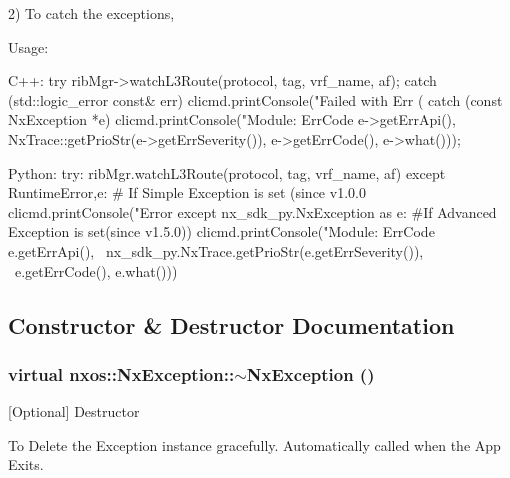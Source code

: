 2) To catch the exceptions, 
\begin{DoxyCode}
  Usage:

  C++:
     try {
         ribMgr->watchL3Route(protocol, tag, vrf_name, af);
     } catch (std::logic_error const& err) {
         clicmd.printConsole("Failed with Err (%
     } catch (const NxException *e) {
         clicmd.printConsole("Module: %
                             ErrCode %
                             e->getErrApi(), 
                             NxTrace::getPrioStr(e->getErrSeverity()), 
                             e->getErrCode(), e->what()));
     }

  Python:
     try:           
        ribMgr.watchL3Route(protocol, tag, vrf_name, af)       
     except RuntimeError,e:                     
        # If Simple Exception is set (since v1.0.0
        clicmd.printConsole("Error %
     except nx_sdk_py.NxException as e:           
        #If Advanced Exception is set(since v1.5.0))
        clicmd.printConsole("Module: %
                            ErrCode %
                            e.getErrApi(), \
                            nx_sdk_py.NxTrace.getPrioStr(e.getErrSeverity()), \
                            e.getErrCode(), e.what()))  
\end{DoxyCode}
 

\subsection{Constructor \& Destructor Documentation}
\hypertarget{classnxos_1_1NxException_a2063f2937b4fdfe7a2e58f0ce727d70c}{
\subsubsection[{$\sim$NxException}]{\setlength{\rightskip}{0pt plus 5cm}virtual nxos::NxException::$\sim$NxException ()}}
\label{classnxos_1_1NxException_a2063f2937b4fdfe7a2e58f0ce727d70c}
\mbox{[}Optional\mbox{]} Destructor

To Delete the Exception instance gracefully. Automatically called when the App Exits. 

